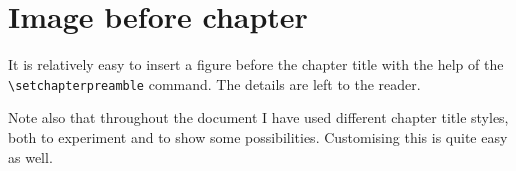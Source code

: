 \section{Image before chapter}

It is relatively easy to insert a figure before the chapter title with 
the help of the \verb|\setchapterpreamble| command. The details are left 
to the reader.

Note also that throughout the document I have used different chapter 
title styles, both to experiment and to show some possibilities. 
Customising this is quite easy as well.
